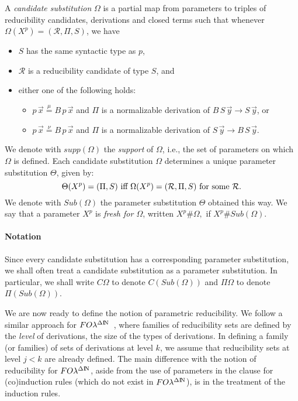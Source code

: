 \documentclass[preprint]{elsarticle}
\def\Rscr{{\mathcal R}}
\newcommand{\FOL   }{FO\lambda}
\newcommand{\FOLDN }{\FOL^{\Delta\N}}
\newcommand{\N}{{\rm I} \! {\rm N}}
\newcommand{\Seq}[2]{#1\longrightarrow #2}
\newcommand{\defmu}{\stackrel{\mu}{=}}
\newcommand{\defnu}{\stackrel{\nu}{=}}
\begin{document}
\begin{definition}
\label{def:candidate-subst}
A \emph{candidate substitution} $\Omega$ is a partial map from parameters to
triples of reducibility candidates, derivations and closed terms
such that whenever $\Omega(X^p) = (\Rscr, \Pi, S)$, we have
\begin{itemize}
\item $S$ has the same syntactic type as $p$, 
\item $\Rscr$ is a reducibility candidate of type $S$, and
\item either one of the following holds:
\begin{itemize}
\item $p\,\vec x \defmu B\,p\,\vec x$ and $\Pi$ is a normalizable
derivation of $\Seq {B\,S\,\vec y}{S\,\vec y}$, or
\item $p\,\vec x \defnu B\,p\,\vec x$ and $\Pi$ is a normalizable
derivation of $\Seq {S\,\vec y}{B\,S\,\vec y}$. 
\end{itemize}
\end{itemize}
\end{definition}
We denote with $supp(\Omega)$ the \emph{support} of $\Omega$,
i.e., the set of parameters on which $\Omega$ is defined.
Each candidate substitution $\Omega$ determines a unique
parameter substitution $\Theta$, given by:
$$
\Theta(X^p) = (\Pi, S) \ \hbox{iff } \Omega(X^p) = (\Rscr, \Pi, S) \
\hbox{for some $\Rscr$}.
$$
We denote with $Sub(\Omega)$ the parameter substitution $\Theta$
obtained this way.  We say that a parameter $X^p$ is \emph{fresh for
  $\Omega$}, written $X^p \# \Omega,$ if $X^p \# Sub(\Omega)$.

\paragraph{Notation}
Since every candidate substitution has a corresponding
parameter substitution, we shall often treat a candidate
substitution as a parameter substitution. In particular,
we shall write $C\Omega$ to denote $C(Sub(\Omega))$
and $\Pi\Omega$ to denote $\Pi(Sub(\Omega))$. 

We are now ready to define the notion of parametric reducibility.  We
follow a similar approach  for $\FOLDN$~\cite{mcdowell00tcs}, where
families of reducibility sets are defined by the \emph{level} of
derivations, \ie the size of the types of
derivations. In defining a family (or families) of sets of derivations
at level $k$, we assume that reducibility sets at level $j < k$ are
already defined. The main difference with the notion of reducibility
for $\FOLDN$, aside from the use of parameters in the clause for
(co)induction rules (which do not exist in $\FOLDN$), is in the
treatment of the induction rules.
\end{document}
